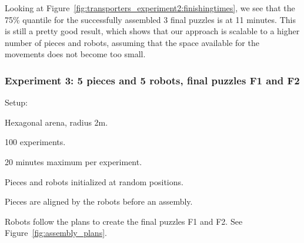 Looking at Figure~\ref{fig:transporters_experiment2:finishingtimes}, we see that the 75\% quantile for the successfully assembled 3 final puzzles is at 11 minutes. This is still a pretty good result, which shows that our approach is scalable to a higher number of pieces and robots, assuming that the space available for the movements does not become too small.


\subsubsection{Experiment 3: 5 pieces and 5 robots, final puzzles F1 and F2} %
\label{ssub:experiment_3_5_pieces_and_5_robots_final_puzzles_f1_and_f2}

Setup:
\begin{my_itemize}
	\item Hexagonal arena, radius 2m.
	\item 100 experiments.
	\item 20 minutes maximum per experiment.
	\item Pieces and robots initialized at random positions.
	\item Pieces are aligned by the robots before an assembly.
	\item Robots follow the plans to create the final puzzles F1 and F2. See Figure~\ref{fig:assembly_plans}.
\end{my_itemize}


